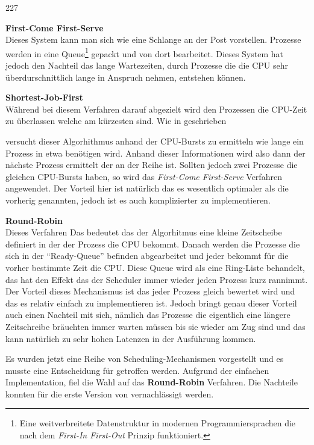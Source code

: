 \begin{dinglist}{227}
	\item{\textbf{First-Come First-Serve}} \\
	Dieses System kann man sich wie eine Schlange an der Post vorstellen. Prozesse werden in eine Queue\footnote{Eine weitverbreitete Datenstruktur in modernen Programmiersprachen die nach dem \textit{First-In First-Out} Prinzip funktioniert.} gepackt und von dort bearbeitet. Dieses System hat jedoch den Nachteil das lange Wartezeiten, durch Prozesse die die CPU sehr \"uberdurschnittlich lange in Anspruch nehmen, entstehen k\"onnen.
	\item{\textbf{Shortest-Job-First}}\\
	W\"ahrend bei diesem Verfahren darauf abgezielt wird den Prozessen die CPU-Zeit zu \"uberlassen welche am k\"urzesten sind. Wie in \cite[189]{scheduling} geschrieben 
\begin{quote}
\end{quote}
versucht dieser Algorhithmus anhand der CPU-Bursts\parencite[vgl.][184]{scheduling} zu ermitteln wie lange ein Prozess in etwa ben\"otigen wird. Anhand dieser Informationen wird also dann der n\"achste Prozess ermittelt der an der Reihe ist.
Sollten jedoch zwei Prozesse die gleichen CPU-Bursts haben, so wird das \textit{First-Come First-Serve} Verfahren angewendet. Der Vorteil hier ist nat\"urlich das es wesentlich optimaler als die vorherig genannten, jedoch ist es auch komplizierter zu implementieren.\\
	\item{\textbf{Round-Robin}}\\
	Dieses Verfahren 
		\parencite[vgl.][194]{scheduling}
Das bedeutet das der Algorhitmus eine kleine Zeitscheibe definiert in der der Prozess die CPU bekommt. Danach werden die Prozesse die sich in der ``Ready-Queue'' befinden abgearbeitet und jeder bekommt f\"ur die vorher bestimmte Zeit die CPU. Diese Queue wird als eine Ring-Liste behandelt, das hat den Effekt das der Scheduler immer wieder jeden Prozess kurz rannimmt. Der Vorteil dieses Mechanismus ist das jeder Prozess gleich bewertet wird und das es relativ einfach zu implementieren ist. Jedoch bringt genau dieser Vorteil auch einen Nachteil mit sich, n\"amlich das Prozesse die eigentlich eine l\"angere Zeitschreibe br\"auchten immer warten m\"ussen bis sie wieder am Zug sind und das kann nat\"urlich zu sehr hohen Latenzen in der Ausf\"uhrung kommen.
\end{dinglist}
Es wurden jetzt eine Reihe von Scheduling-Mechanismen vorgestellt und es musste eine Entscheidung f\"ur \mops getroffen werden. Aufgrund der einfachen Implementation, fiel die Wahl auf das \textbf{Round-Robin} Verfahren. Die Nachteile konnten f\"ur die erste Version von \mops vernachl\"assigt werden.
